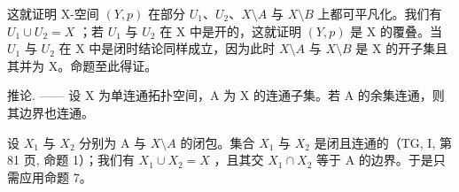 这就证明 X-空间 \((Y,p)\) 在部分 \(U_{1}\)、\(U_{2}\)、\(X\setminus A\) 与 \(X\setminus B\) 上都可平凡化。我们有 \(U_{1} \cup U_{2} = X\) ；若 \(U_{1}\) 与 \(U_{2}\) 在 X 中是开的，这就证明 \((Y,p)\) 是 X 的覆叠。当 \(U_{1}\) 与 \(U_{2}\) 在 X 中是闭时结论同样成立，因为此时 \(X\setminus A\) 与 \(X\setminus B\) 是 X 的开子集且其并为 X。命题至此得证。

推论. —— 设 X 为单连通拓扑空间，A 为 X 的连通子集。若 A 的余集连通，则其边界也连通。

设 \(X_{1}\) 与 \(X_{2}\) 分别为 A 与 \(X\setminus A\) 的闭包。集合 \(X_{1}\) 与 \(X_{2}\) 是闭且连通的（TG, I, 第 81 页, 命题 1）；我们有 \(X_{1} \cup X_{2} = X\) ，且其交 \(X_{1} \cap X_{2}\) 等于 A 的边界。于是只需应用命题 7。
\relax{}
